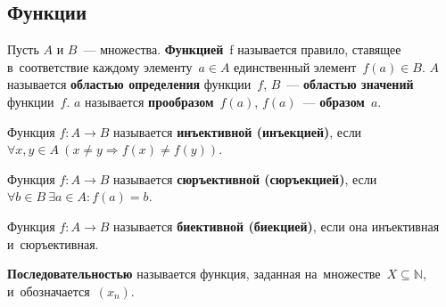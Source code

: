 \subsection{Функции}
Пусть $A$ и $B$~--- множества.
\textbf{Функцией}~f называется правило, ставящее в~соответствие каждому элементу~$a \in A$ единственный элемент~$f(a) \in B$.
$A$ называется \textbf{областью определения} функции~$f$, $B$~--- \textbf{областью значений} функции~$f$.
$a$ называется \textbf{прообразом}~$f(a)$, $f(a)$~--- \textbf{образом}~$a$.

Функция $f \colon A \to B$ называется \textbf{инъективной (инъекцией)}, если
$\forall x, y \in A	\ \allowbreak (x \neq y \Rightarrow f(x) \neq f(y))$.

Функция $f \colon A \to B$ называется \textbf{сюръективной (сюръекцией)}, если
$\forall b \in B \ \allowbreak \exists a \in A \colon \allowbreak f(a) = b$.

Функция $f \colon A \to B$ называется \textbf{биективной (биекцией)}, если она инъективная
и~сюръективная.

\textbf{Последовательностью} называется функция, заданная на~множестве~$X \subseteq \mathbb N$, и~обозначается~$(x_n)$.
